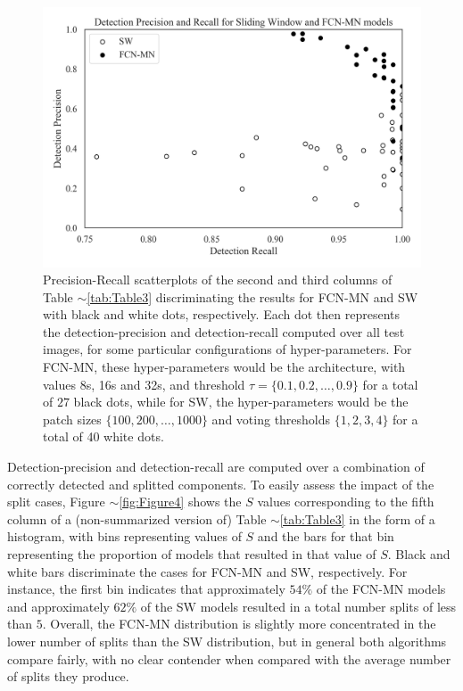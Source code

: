 \documentclass[a4paper,authoryear,review]{elsarticle}
\begin{document}
	
	\begin{figure}
		\centering
		\includegraphics[width=\textwidth]{figures/Figure3.png}
		\caption{
			Precision-Recall scatterplots of the second and third columns of Table $\sim$\ref{tab:Table3} discriminating the results for FCN-MN and SW with black and white dots, respectively. Each dot then represents the detection-precision and detection-recall computed over all test images, for some particular configurations of hyper-parameters. For FCN-MN, these hyper-parameters would be the architecture, with values 8s, 16s and 32s, and threshold $\tau = \{0.1, 0.2, \ldots, 0.9\}$  for a total of $27$ black dots, while for SW, the hyper-parameters would be the patch sizes  $\{100, 200, \ldots, 1000\}$ and voting thresholds $\{1, 2, 3, 4\}$ for a total of 40 white dots.
		}
		\label{fig:Figure3}
	\end{figure}
	
	
	Detection-precision and detection-recall are computed over a combination of correctly detected and splitted components. To easily assess the impact of the split cases, Figure $\sim$\ref{fig:Figure4} shows the $S$ values corresponding to the fifth column of a   (non-summarized version of) Table $\sim$\ref{tab:Table3} in the form of a histogram, with bins representing values of $S$ and the bars for that bin representing the proportion of models that resulted in that value of $S$. Black and white bars discriminate the cases for FCN-MN and SW, respectively. For instance, the first bin indicates that approximately $54\%$ of the FCN-MN models and approximately $62\%$ of the SW models resulted in a total number splits of less than $5$. Overall, the FCN-MN distribution is slightly more concentrated in the lower number of splits than the SW distribution, but in general both algorithms compare fairly, with no clear contender when compared with the average number of splits they produce. 
	
\end{document}

